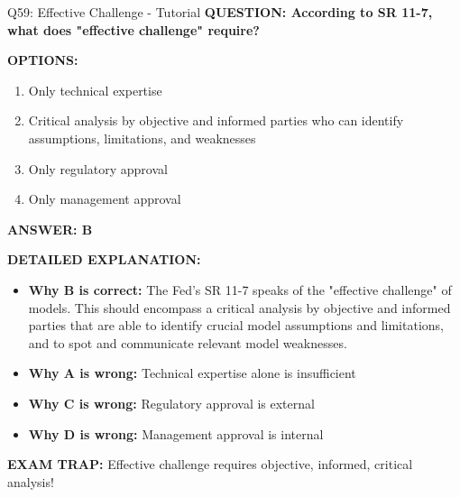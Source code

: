 \documentclass[8pt]{beamer}
\begin{document}
	\begin{frame}{Q59: Effective Challenge - Tutorial}
		\fontsize{6.5}{7.5}\selectfont
		\textbf{QUESTION: According to SR 11-7, what does "effective challenge" require?}
		
		\vspace{0.1cm}
		\textbf{OPTIONS:}
		\begin{enumerate}
			\item Only technical expertise
			\item Critical analysis by objective and informed parties who can identify assumptions, limitations, and weaknesses
			\item Only regulatory approval
			\item Only management approval
		\end{enumerate}
		
		\vspace{0.1cm}
		\textcolor{myblue}{\textbf{ANSWER: B}}
		
		\vspace{0.1cm}
		\textbf{DETAILED EXPLANATION:}
		\begin{itemize}
			\item \textbf{Why B is correct:} The Fed's SR 11-7 speaks of the "effective challenge" of models. This should encompass a critical analysis by objective and informed parties that are able to identify crucial model assumptions and limitations, and to spot and communicate relevant model weaknesses.
			\item \textbf{Why A is wrong:} Technical expertise alone is insufficient
			\item \textbf{Why C is wrong:} Regulatory approval is external
			\item \textbf{Why D is wrong:} Management approval is internal
		\end{itemize}
		
		\textcolor{myred}{\textbf{EXAM TRAP:}} Effective challenge requires \textcolor{myblue}{objective, informed, critical analysis}!
	\end{frame}
	
\end{document}

